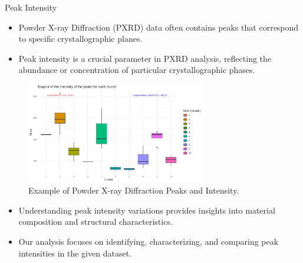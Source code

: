 \documentclass[aspectratio=169]{beamer}
\begin{document}
\begin{frame}{Peak Intensity}
    \begin{itemize}
        \item Powder X-ray Diffraction (PXRD) data often contains peaks that correspond to specific crystallographic planes.
        \item Peak intensity is a crucial parameter in PXRD analysis, reflecting the abundance or concentration of particular crystallographic phases.
    \end{itemize}

    \begin{figure}
        \includegraphics[width=0.7\textwidth]{../plot/intensity.png}
        \caption{Example of Powder X-ray Diffraction Peaks and Intensity.}
    \end{figure}

    \begin{itemize}
        \item Understanding peak intensity variations provides insights into material composition and structural characteristics.
        \item Our analysis focuses on identifying, characterizing, and comparing peak intensities in the given dataset.
    \end{itemize}
\end{frame}
\end{document}
